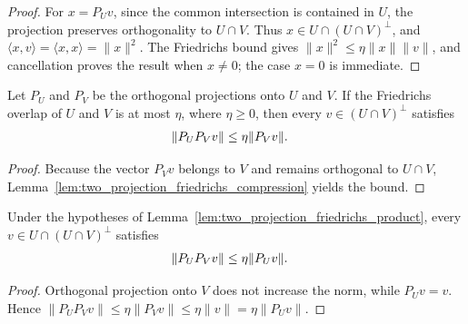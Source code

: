 \begin{proof}
    \leanok
    For $x=P_Uv$, since the common intersection is contained in $U$, the
    projection preserves orthogonality to $U\cap V$. Thus
    $x\in U\cap(U\cap V)^\perp$, and
    $\langle x,v\rangle=\langle x,x\rangle=\|x\|^2$. The Friedrichs bound gives
    $\|x\|^2\le\eta\|x\|\|v\|$, and cancellation proves the result when
    $x\ne0$; the case $x=0$ is immediate.
\end{proof}

\begin{lemma}
    \label{lem:two_projection_friedrichs_product}
    \leanok
    Let $P_U$ and $P_V$ be the orthogonal projections onto $U$ and $V$. If the
    Friedrichs overlap of $U$ and $V$ is at most $\eta$, where $\eta\ge0$, then
    every $v\in(U\cap V)^\perp$ satisfies
    \begin{align}
        \|P_UP_Vv\|
         & \le\eta\|P_Vv\|. \notag
    \end{align}
\end{lemma}

\begin{proof}
    \leanok
    Because the vector $P_Vv$ belongs to $V$ and remains orthogonal to
    $U\cap V$, Lemma~\ref{lem:two_projection_friedrichs_compression} yields
    the bound.
\end{proof}

\begin{lemma}
    \label{lem:two_projection_friedrichs_directional}
    \leanok
    Under the hypotheses of
    Lemma~\ref{lem:two_projection_friedrichs_product}, every
    $v\in U\cap(U\cap V)^\perp$ satisfies
    \begin{align}
        \|P_UP_Vv\|
         & \le\eta\|P_Uv\|. \notag
    \end{align}
\end{lemma}

\begin{proof}
    \leanok
    Orthogonal projection onto $V$ does not increase the norm, while
    $P_Uv=v$. Hence
    $\|P_UP_Vv\|\le\eta\|P_Vv\|\le\eta\|v\|=\eta\|P_Uv\|$.
\end{proof}

